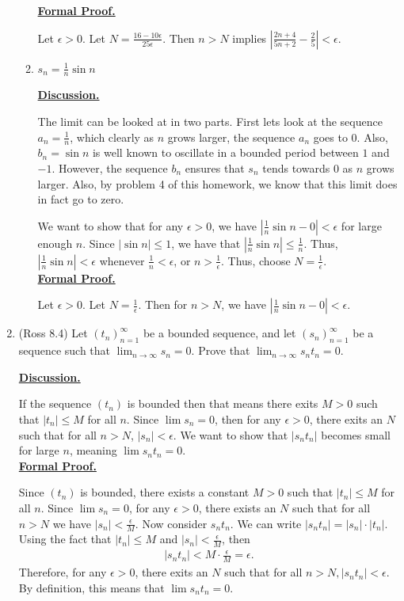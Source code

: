 \documentclass [10pt]{article}
\newcommand{\jg}[1]{{\color{blue} #1}}
\begin{document}
\begin{enumerate}
\begin{enumerate}
{\textbf{\underline{Formal Proof.}}

Let $\epsilon > 0$. Let $N = \frac{16-10\epsilon}{25\epsilon}$. Then $n > N$ implies $|\frac{2n+4}{5n+2} - \frac{2}{5}| < \epsilon$.
}
\item $s_n = \frac{1}{n}\sin n$

\jg{
\textbf{\underline{Discussion.}}

The limit can be looked at in two parts. First lets look at the sequence $a_n = \frac{1}{n}$, which clearly as $n$ grows larger, the sequence $a_n$ goes to 0. Also, $b_n = \sin n$ is well known to oscillate in a bounded period between $1$ and $-1$. However, the sequence $b_n$ ensures that $s_n$ tends towards $0$ as $n$ grows larger. Also, by problem 4 of this homework, we know that this limit does in fact go to zero. 

We want to show that for any $\epsilon > 0$, we have $|\frac{1}{n} \sin n - 0| < \epsilon$ for large enough $n$. Since $|\sin n| \leq 1$, we have that $|\frac{1}{n} \sin n | \leq \frac{1}{n}$. Thus, $|\frac{1}{n} \sin n | < \epsilon$ whenever $\frac{1}{n} < \epsilon$, or $n > \frac{1}{\epsilon}$. Thus, choose $N = \frac{1}{\epsilon}$. \\

\textbf{\underline{Formal Proof.}}

Let $\epsilon > 0$. Let $N = \frac{1}{\epsilon}$. Then for $n > N$, we have $|\frac{1}{n}\sin n - 0| < \epsilon$. 

}
 
\end{enumerate}
\clearpage
\item (Ross 8.4) Let $(t_n)_{n=1}^{\infty}$ be a bounded sequence, and let $
(s_n)_{n=1}^{\infty}$ be a sequence such that $\lim_{n\to \infty} s_n= 0$. Prove
that $\lim_{n \to \infty} s_nt_n= 0$.

\jg{
\textbf{\underline{Discussion.}}

If the sequence $(t_n)$ is bounded then that means there exits $M > 0$ such that $|t_n| \leq M$ for all $n$. Since $\lim s_n = 0$, then for any $\epsilon > 0$, there exits an $N$ such that for all $n > N$, $|s_n| < \epsilon$. We want to show that $|s_n t_n|$ becomes small for large $n$, meaning $\lim s_n t_n = 0$. \\

\textbf{\underline{Formal Proof.}}

Since $(t_n)$ is bounded, there exists a constant $M > 0$ such that $|t_n| \leq M$ for all $n$. Since $\lim s_n = 0$, for any $\epsilon > 0$, there exists an $N$ such that for all $n > N$ we have $|s_n| < \frac{\epsilon}{M}$. Now consider $s_n t_n$. We can write $|s_n t_n| = |s_n| \cdot |t_n|$. Using the fact that $|t_n| \leq M$ and $|s_n| < \frac{\epsilon}{M}$, then 
\begin{align*}
    |s_n t_n| < M \cdot \frac{\epsilon}{M} = \epsilon. 
\end{align*}
Therefore, for any $\epsilon > 0$, there exits an $N$ such that for all $n > N, |s_n t_n| < \epsilon$. By definition, this means that $\lim s_n t_n = 0$. 
}


\end{enumerate}
\end{document}
